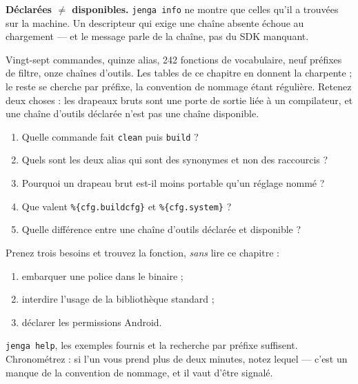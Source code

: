 \begin{nkretenir}
\textbf{Déclarées $\neq$ disponibles.} \texttt{jenga info} ne montre que celles
qu'il a trouvées sur la machine. Un descripteur qui exige une chaîne absente
échoue au chargement --- et le message parle de la chaîne, pas du SDK manquant.
\end{nkretenir}

\begin{nkbilan}
Vingt-sept commandes, quinze alias, 242 fonctions de vocabulaire, neuf préfixes
de filtre, onze chaînes d'outils. Les tables de ce chapitre en donnent la
charpente ; le reste se cherche par préfixe, la convention de nommage étant
régulière. Retenez deux choses : les drapeaux bruts sont une porte de sortie liée
à un compilateur, et une chaîne d'outils déclarée n'est pas une chaîne
disponible.
\end{nkbilan}

\begin{nkquestions}
\begin{enumerate}
\item Quelle commande fait \texttt{clean} puis \texttt{build} ?
\item Quels sont les deux alias qui sont des synonymes et non des raccourcis ?
\item Pourquoi un drapeau brut est-il moins portable qu'un réglage nommé ?
\item Que valent \texttt{\%\{cfg.buildcfg\}} et \texttt{\%\{cfg.system\}} ?
\item Quelle différence entre une chaîne d'outils déclarée et disponible ?
\end{enumerate}
\end{nkquestions}

\begin{nkpratique}
Prenez trois besoins et trouvez la fonction, \emph{sans} lire ce chapitre :

\begin{enumerate}
\item embarquer une police dans le binaire ;
\item interdire l'usage de la bibliothèque standard ;
\item déclarer les permissions Android.
\end{enumerate}

\texttt{jenga help}, les exemples fournis et la recherche par préfixe suffisent.
Chronométrez : si l'un vous prend plus de deux minutes, notez lequel --- c'est un
manque de la convention de nommage, et il vaut d'être signalé.
\end{nkpratique}

